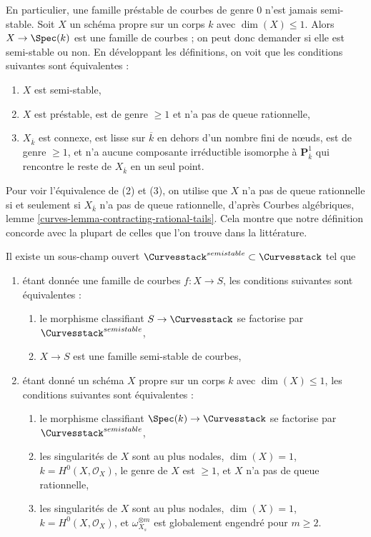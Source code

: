 \noindent
En particulier, une famille préstable de courbes de genre $0$ n'est jamais
semi-stable.
Soit $X$ un schéma propre sur un corps $k$ avec $\dim(X) \leq 1$.
Alors $X \to \Spec(k)$ est une famille de courbes ; on peut donc demander
si elle est semi-stable ou non. En développant les définitions, on voit que
les conditions suivantes sont équivalentes :
\begin{enumerate}
\item $X$ est semi-stable,
\item $X$ est préstable, est de genre $\geq 1$ et n'a pas de queue rationnelle,
\item $X_{\overline{k}}$ est connexe, est lisse sur $\overline{k}$
en dehors d'un nombre fini de nœuds, est de genre $\geq 1$, et n'a aucune
composante irréductible isomorphe à $\mathbf{P}^1_{\overline{k}}$
qui rencontre le reste de $X_{\overline{k}}$ en un seul point.
\end{enumerate}
Pour voir l'équivalence de (2) et (3), on utilise que $X$ n'a pas de queue rationnelle
si et seulement si $X_{\overline{k}}$ n'a pas de queue rationnelle, d'après
Courbes algébriques, lemme \ref{curves-lemma-contracting-rational-tails}.
Cela montre que notre définition concorde avec la plupart de celles que l'on trouve
dans la littérature.

\begin{lemma}
\label{lemma-semistable-curves}
Il existe un sous-champ ouvert $\Curvesstack^{semistable} \subset \Curvesstack$
tel que
\begin{enumerate}
\item étant donnée une famille de courbes $f : X \to S$, les conditions suivantes sont équivalentes :
\begin{enumerate}
\item le morphisme classifiant $S \to \Curvesstack$ se factorise
par $\Curvesstack^{semistable}$,
\item $X \to S$ est une famille semi-stable de courbes,
\end{enumerate}
\item étant donné un schéma $X$ propre sur un corps $k$ avec
$\dim(X) \leq 1$, les conditions suivantes sont équivalentes :
\begin{enumerate}
\item le morphisme classifiant $\Spec(k) \to \Curvesstack$
se factorise par $\Curvesstack^{semistable}$,
\item les singularités de $X$ sont au plus nodales, $\dim(X) = 1$,
$k = H^0(X, \mathcal{O}_X)$, le genre de $X$ est $\geq 1$, et
$X$ n'a pas de queue rationnelle,
\item les singularités de $X$ sont au plus nodales, $\dim(X) = 1$,
$k = H^0(X, \mathcal{O}_X)$, et $\omega_{X_s}^{\otimes m}$ est
globalement engendré pour $m \geq 2$.
\end{enumerate}
\end{enumerate}
\end{lemma}

